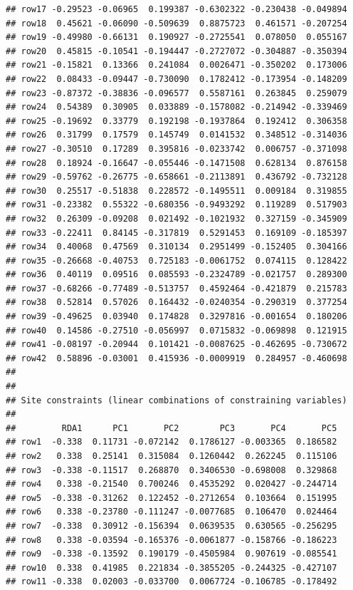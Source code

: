 \documentclass[
]{article}
\begin{document}
\begin{verbatim}
## row17 -0.29523 -0.06965  0.199387 -0.6302322 -0.230438 -0.049894
## row18  0.45621 -0.06090 -0.509639  0.8875723  0.461571 -0.207254
## row19 -0.49980 -0.66131  0.190927 -0.2725541  0.078050  0.055167
## row20  0.45815 -0.10541 -0.194447 -0.2727072 -0.304887 -0.350394
## row21 -0.15821  0.13366  0.241084  0.0026471 -0.350202  0.173006
## row22  0.08433 -0.09447 -0.730090  0.1782412 -0.173954 -0.148209
## row23 -0.87372 -0.38836 -0.096577  0.5587161  0.263845  0.259079
## row24  0.54389  0.30905  0.033889 -0.1578082 -0.214942 -0.339469
## row25 -0.19692  0.33779  0.192198 -0.1937864  0.192412  0.306358
## row26  0.31799  0.17579  0.145749  0.0141532  0.348512 -0.314036
## row27 -0.30510  0.17289  0.395816 -0.0233742  0.006757 -0.371098
## row28  0.18924 -0.16647 -0.055446 -0.1471508  0.628134  0.876158
## row29 -0.59762 -0.26775 -0.658661 -0.2113891  0.436792 -0.732128
## row30  0.25517 -0.51838  0.228572 -0.1495511  0.009184  0.319855
## row31 -0.23382  0.55322 -0.680356 -0.9493292  0.119289  0.517903
## row32  0.26309 -0.09208  0.021492 -0.1021932  0.327159 -0.345909
## row33 -0.22411  0.84145 -0.317819  0.5291453  0.169109 -0.185397
## row34  0.40068  0.47569  0.310134  0.2951499 -0.152405  0.304166
## row35 -0.26668 -0.40753  0.725183 -0.0061752  0.074115  0.128422
## row36  0.40119  0.09516  0.085593 -0.2324789 -0.021757  0.289300
## row37 -0.68266 -0.77489 -0.513757  0.4592464 -0.421879  0.215783
## row38  0.52814  0.57026  0.164432 -0.0240354 -0.290319  0.377254
## row39 -0.49625  0.03940  0.174828  0.3297816 -0.001654  0.180206
## row40  0.14586 -0.27510 -0.056997  0.0715832 -0.069898  0.121915
## row41 -0.08197 -0.20944  0.101421 -0.0087625 -0.462695 -0.730672
## row42  0.58896 -0.03001  0.415936 -0.0009919  0.284957 -0.460698
## 
## 
## Site constraints (linear combinations of constraining variables)
## 
##         RDA1      PC1       PC2        PC3       PC4       PC5
## row1  -0.338  0.11731 -0.072142  0.1786127 -0.003365  0.186582
## row2   0.338  0.25141  0.315084  0.1260442  0.262245  0.115106
## row3  -0.338 -0.11517  0.268870  0.3406530 -0.698008  0.329868
## row4   0.338 -0.21540  0.700246  0.4535292  0.020427 -0.244714
## row5  -0.338 -0.31262  0.122452 -0.2712654  0.103664  0.151995
## row6   0.338 -0.23780 -0.111247 -0.0077685  0.106470  0.024464
## row7  -0.338  0.30912 -0.156394  0.0639535  0.630565 -0.256295
## row8   0.338 -0.03594 -0.165376 -0.0061877 -0.158766 -0.186223
## row9  -0.338 -0.13592  0.190179 -0.4505984  0.907619 -0.085541
## row10  0.338  0.41985  0.221834 -0.3855205 -0.244325 -0.427107
## row11 -0.338  0.02003 -0.033700  0.0067724 -0.106785 -0.178492

\end{verbatim}
\end{document}
